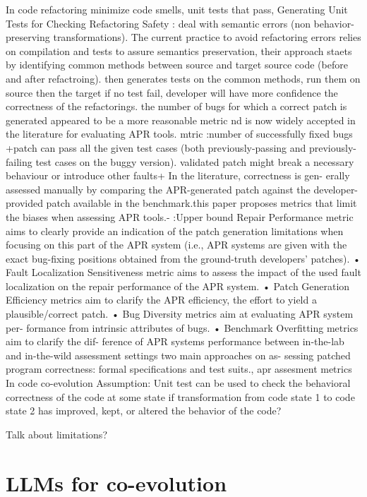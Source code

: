 In code refactoring minimize code smells, unit tests that pass,
\cite{soares2009generating} Generating Unit Tests for Checking Refactoring Safety : deal with semantic errors (non behavior-preserving transformations). The current practice to avoid refactoring errors relies on compilation and tests to
assure semantics preservation, their approach staets by identifying common methods between source and target source code (before and after refactroing). then generates tests on the common methods, run them on source then the target if no test fail, developer will have more confidence the correctness of the refactorings.
\cite{LIU2021110817} the number of bugs for which a correct patch is generated appeared to be a more reasonable metric nd is now widely accepted in the literature for evaluating APR tools.  mtric :number of successfully fixed bugs +patch can pass all the given test cases (both previously-passing and previously-failing test cases on the buggy version). validated patch might break a necessary behaviour or introduce other faults+
In the literature, correctness is gen- erally assessed manually by comparing the APR-generated patch against the developer-provided patch available in the benchmark.this paper proposes metrics that limit the biases when assessing APR tools.- :Upper bound Repair Performance metric aims to clearly provide an indication of the patch generation limitations when focusing on this part of the APR system (i.e., APR systems are given with the exact bug-fixing positions obtained from the ground-truth developers’ patches).
• Fault Localization Sensitiveness metric aims to assess the impact of the used fault localization on the repair performance of the APR system.
• Patch Generation Efficiency metrics aim to clarify the APR efficiency, the effort to yield a plausible/correct patch.
• Bug Diversity metrics aim at evaluating APR system per- formance from intrinsic attributes of bugs.
• Benchmark Overfitting metrics aim to clarify the dif- ference of APR systems performance between in-the-lab and in-the-wild assessment settings
\cite{8612557} two main approaches on as- sessing patched program correctness: formal specifications and test suits., apr assesment metrics
In code co-evolution 
Assumption: 
Unit test can be used to check the behavioral correctness of the code at some state
if transformation from code state 1  to code state 2 has improved, kept, or altered the behavior of the code?
 
 Talk about limitations?
  \section{LLMs for co-evolution }



